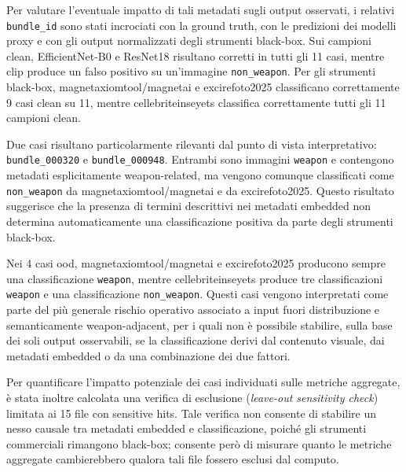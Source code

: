 Per valutare l'eventuale impatto di tali metadati sugli output osservati, i
relativi \texttt{bundle\_id} sono stati incrociati con la ground truth, con le
predizioni dei modelli proxy e con gli output normalizzati degli strumenti
black-box. Sui campioni clean, EfficientNet-B0 e ResNet18 risultano corretti in
tutti gli 11 casi, mentre \gls{clip} produce un falso positivo su un'immagine
\texttt{non\_weapon}. Per gli strumenti black-box,
\gls{magnetaxiomtool}/\gls{magnetai} e \gls{excirefoto2025} classificano
correttamente 9 casi clean su 11, mentre \gls{cellebriteinseyets} classifica
correttamente tutti gli 11 campioni clean.

Due casi risultano particolarmente rilevanti dal punto di vista interpretativo:
\texttt{bundle\_000320} e \texttt{bundle\_000948}. Entrambi sono immagini
\texttt{weapon} e contengono metadati esplicitamente weapon-related, ma vengono
comunque classificati come \texttt{non\_weapon} da
\gls{magnetaxiomtool}/\gls{magnetai} e da \gls{excirefoto2025}. Questo risultato
suggerisce che la presenza di termini descrittivi nei metadati embedded non
determina automaticamente una classificazione positiva da parte degli strumenti
black-box.

Nei 4 casi \gls{ood}, \gls{magnetaxiomtool}/\gls{magnetai} e
\gls{excirefoto2025} producono sempre una classificazione \texttt{weapon}, mentre
\gls{cellebriteinseyets} produce tre classificazioni \texttt{weapon} e una
classificazione \texttt{non\_weapon}. Questi casi vengono interpretati come parte
del più generale rischio operativo associato a input fuori distribuzione e
semanticamente weapon-adjacent, per i quali non è possibile stabilire, sulla base
dei soli output osservabili, se la classificazione derivi dal contenuto visuale,
dai metadati embedded o da una combinazione dei due fattori.



Per quantificare l'impatto potenziale dei casi individuati sulle metriche
aggregate, è stata inoltre calcolata una verifica di esclusione
(\emph{leave-out sensitivity check}) limitata ai 15 file con sensitive hits. Tale
verifica non consente di stabilire un nesso causale tra metadati embedded e
classificazione, poiché gli strumenti commerciali rimangono black-box; consente
però di misurare quanto le metriche aggregate cambierebbero qualora tali file
fossero esclusi dal computo.



